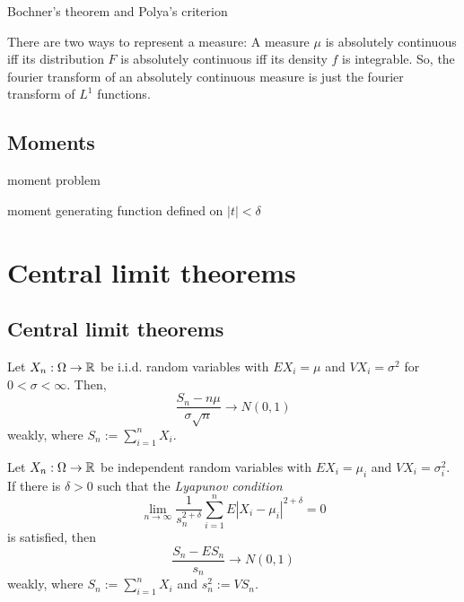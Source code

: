\documentclass{../note}
\begin{document}
\begin{prb}
Bochner's theorem and Polya's criterion
\end{prb}


There are two ways to represent a measure:
A measure $\mu$ is absolutely continuous iff its distribution $F$ is absolutely continuous iff its density $f$ is integrable.
So, the fourier transform of an absolutely continuous measure is just the fourier transform of $L^1$ functions.



\section{Moments}

moment problem

moment generating function defined on $|t|<\delta$


















\chapter{Central limit theorems}





\section{Central limit theorems}

\begin{prb}
Let $X_n:\Omega\to\mathbb{R}$ be i.i.d. random variables with $EX_i=\mu$ and $VX_i=\sigma^2$ for $0<\sigma<\infty$.
Then,
\[\frac{S_n-n\mu}{\sigma\sqrt n}\to N(0,1)\]
weakly, where $S_n:=\sum_{i=1}^nX_i$.
\end{prb}

\begin{prb}
Let $X_n:\Omega\to\mathbb{R}$ be independent random variables with $EX_i=\mu_i$ and $VX_i=\sigma_i^2$.
If there is $\delta>0$ such that the \emph{Lyapunov condition}
\[\lim_{n\to\infty}\frac1{s_n^{2+\delta}}\sum_{i=1}^nE|X_i-\mu_i|^{2+\delta}=0\]
is satisfied, then
\[\frac{S_n-ES_n}{s_n}\to N(0,1)\]
weakly, where $S_n:=\sum_{i=1}^nX_i$ and $s_n^2:=VS_n$.
\end{prb}
\end{document}
